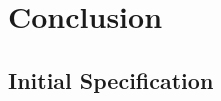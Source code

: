 \documentclass[12pt, a4paper, twoside, onecolumn]{article}
\begin{document}

\section{Conclusion}





\begin{appendices}
  \section{Initial Specification}
  \label{initial_spec}
  
\end{appendices}
\end{document}
